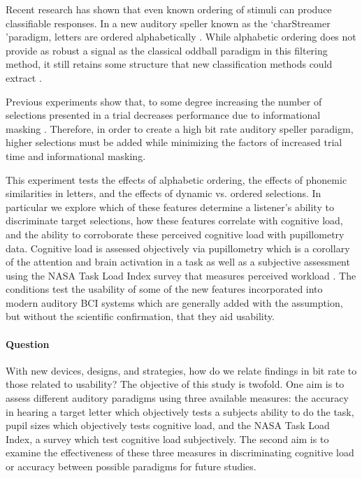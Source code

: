 \documentclass[10pt]{article}
\begin{document}
Recent research has shown that even known ordering of stimuli can
produce classifiable responses.  In a new auditory speller known
as the \lq charStreamer \rq paradigm, letters are ordered
alphabetically \cite{Hohne2014}.  While alphabetic ordering does not
provide as robust a signal as the classical oddball paradigm in this
filtering method, it still retains some structure that
new classification methods could extract \cite{Hohne2014}.  

Previous experiments show that, to some degree increasing the number
of selections presented in a trial decreases performance due to
informational masking \cite{Maddox2012a}. Therefore, in order to
create a high bit rate auditory speller paradigm, higher selections
must be added while minimizing the factors of increased trial time
and informational masking. 



This experiment tests the effects of alphabetic ordering, the
effects of phonemic similarities in letters, and the effects
of dynamic vs. ordered selections.  In particular we explore
which of these features determine a listener's ability to
discriminate target selections, how these features correlate
with cognitive load, and the ability to corroborate these
perceived cognitive load with pupillometry data.  Cognitive load is
assessed objectively via pupillometry which is a corollary of
the attention and brain activation in a task as well as a
subjective assessment using the NASA Task Load Index survey
that measures perceived workload \cite{Zickler2013a}.  The
conditions test the usability of some of the new features
incorporated into modern auditory BCI systems which are
generally added with the assumption, but without the scientific
confirmation, that they aid usability.    

\paragraph{Question}

With new devices, designs, and strategies, how do we relate
findings in bit rate to those related to usability?  The
objective of this study is twofold.  One aim is to assess
different auditory paradigms using three available measures:
the accuracy in hearing a target letter which objectively
tests a subjects ability to do the task,  pupil sizes which
objectively tests cognitive load, and the NASA Task Load
Index, a survey which test cognitive load subjectively.  The
second aim is to examine the effectiveness of these three
measures in discriminating cognitive load or accuracy between
possible paradigms for future studies.
\end{document}
